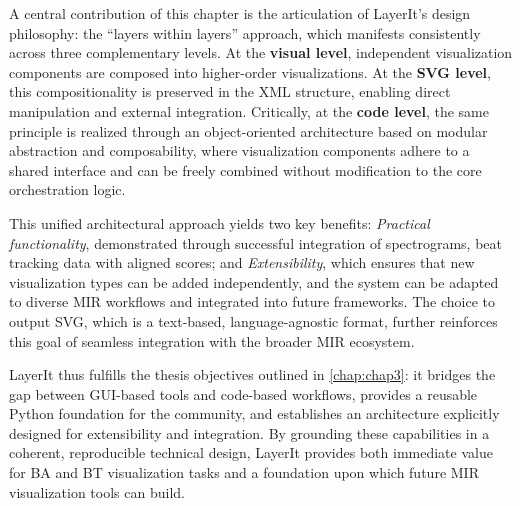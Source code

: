 A central contribution of this chapter is the articulation of LayerIt's design philosophy: the ``layers within layers'' approach, which manifests consistently across three complementary levels. At the \textbf{visual level}, independent visualization components are composed into higher-order visualizations. At the \textbf{SVG level}, this compositionality is preserved in the XML structure, enabling direct manipulation and external integration. Critically, at the \textbf{code level}, the same principle is realized through an object-oriented architecture based on modular abstraction and composability, where visualization components adhere to a shared interface and can be freely combined without modification to the core orchestration logic.

This unified architectural approach yields two key benefits: \textit{Practical functionality}, demonstrated through successful integration of spectrograms, beat tracking data with aligned scores; and \textit{Extensibility}, which ensures that new visualization types can be added independently, and the system can be adapted to diverse MIR workflows and integrated into future frameworks. The choice to output SVG, which is a text-based, language-agnostic format, further reinforces this goal of seamless integration with the broader MIR ecosystem.

LayerIt thus fulfills the thesis objectives outlined in \autoref{chap:chap3}: it bridges the gap between GUI-based tools and code-based workflows, provides a reusable Python foundation for the community, and establishes an architecture explicitly designed for extensibility and integration. By grounding these capabilities in a coherent, reproducible technical design, LayerIt provides both immediate value for BA and BT visualization tasks and a foundation upon which future MIR visualization tools can build.
